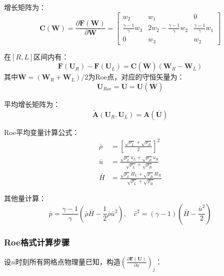 \documentclass[12pt,a4paper]{article}
\begin{document}
增长矩阵为：
$$
\mathbf{C}(\mathbf{W}) = \frac{\partial \mathbf{F}(\mathbf{W})}{\partial \mathbf{W}} = 
\begin{bmatrix}
w_2 & w_1 & 0 \\
\frac{\gamma-1}{\gamma}w_3 & 2w_2 - \frac{\gamma-1}{\gamma}w_2 & \frac{\gamma-1}{\gamma}w_1 \\
0 & w_3 & w_2
\end{bmatrix}
$$

在$[R,L]$区间内有：
$$
\mathbf{F}(\mathbf{U}_R) - \mathbf{F}(\mathbf{U}_L) = \mathbf{C}(\overline{\mathbf{W}})(\mathbf{W}_R - \mathbf{W}_L)
$$
其中$\overline{\mathbf{W}} = (\mathbf{W}_R + \mathbf{W}_L)/2$为Roe点，对应的守恒矢量为：
$$
\mathbf{U}_{Roe} = \overline{\mathbf{U}} = \mathbf{U}(\overline{\mathbf{W}})
$$

平均增长矩阵为：
$$
\widetilde{\mathbf{A}}(\mathbf{U}_R, \mathbf{U}_L) = \mathbf{A}(\overline{\mathbf{U}})
$$

Roe平均变量计算公式：
\begin{align*}
    \bar{\rho} &= \left[ \frac{\sqrt{\rho_L} + \sqrt{\rho_R}}{2} \right]^2 \\
    \bar{u} &= \frac{\sqrt{\rho_L} u_L + \sqrt{\rho_R} u_R}{\sqrt{\rho_L} + \sqrt{\rho_R}} \\
    \bar{H} &= \frac{\sqrt{\rho_L} H_L + \sqrt{\rho_R} H_R}{\sqrt{\rho_L} + \sqrt{\rho_R}}
\end{align*}

其他量计算：
$$
\bar{p} = \frac{\gamma-1}{\gamma}\left(\bar{\rho}\bar{H} - \frac{1}{2}\bar{\rho}\bar{u}^2\right), \quad
\bar{c}^2 = (\gamma-1)\left(\bar{H} - \frac{\bar{u}^2}{2}\right)
$$

\subsubsection{Roe格式计算步骤}
设$n$时刻所有网格点物理量已知，构造$\left(\frac{\partial \mathbf{F}(\mathbf{U})}{\partial x}\right)_j$：
\end{document}
